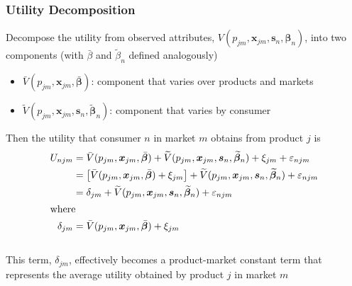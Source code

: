 \documentclass{beamer}
\begin{document}
\begin{frame}\frametitle{Utility Decomposition}
    Decompose the utility from observed attributes, $V(p_{jm}, \bm{x}_{jm}, \bm{s}_n, \bm{\beta}_n)$, into two components (with $\bar{\beta}$ and $\widetilde{\beta}_n$ defined analogously)
    \begin{itemize}
        \item $\bar{V}(p_{jm}, \bm{x}_{jm}, \bar{\bm{\beta}})$: component that varies over products and markets
        \item $\widetilde{V}(p_{jm}, \bm{x}_{jm}, \bm{s}_n, \widetilde{\bm{\beta}}_n)$: component that varies by consumer
    \end{itemize}
    \vspace{2ex}
    Then the utility that consumer $n$ in market $m$ obtains from product $j$ is
    \begin{align*}
        U_{njm} & = \bar{V}(p_{jm}, \bm{x}_{jm}, \bar{\bm{\beta}}) + \widetilde{V}(p_{jm}, \bm{x}_{jm}, \bm{s}_n, \widetilde{\bm{\beta}}_n) + \xi_{jm} + \varepsilon_{njm} \\
        & = \left[ \bar{V}(p_{jm}, \bm{x}_{jm}, \bar{\bm{\beta}}) + \xi_{jm} \right] + \widetilde{V}(p_{jm}, \bm{x}_{jm}, \bm{s}_n, \widetilde{\bm{\beta}}_n) + \varepsilon_{njm} \\
        & = \delta_{jm} + \widetilde{V}(p_{jm}, \bm{x}_{jm}, \bm{s}_n, \widetilde{\bm{\beta}}_n) + \varepsilon_{njm} \\
        \intertext{where}
        \delta_{jm} & = \bar{V}(p_{jm}, \bm{x}_{jm}, \bar{\bm{\beta}}) + \xi_{jm}
    \end{align*} \\
    This term, $\delta_{jm}$, effectively becomes a product-market constant term that represents the average utility obtained by product $j$ in market $m$
\end{frame}
\end{document}
